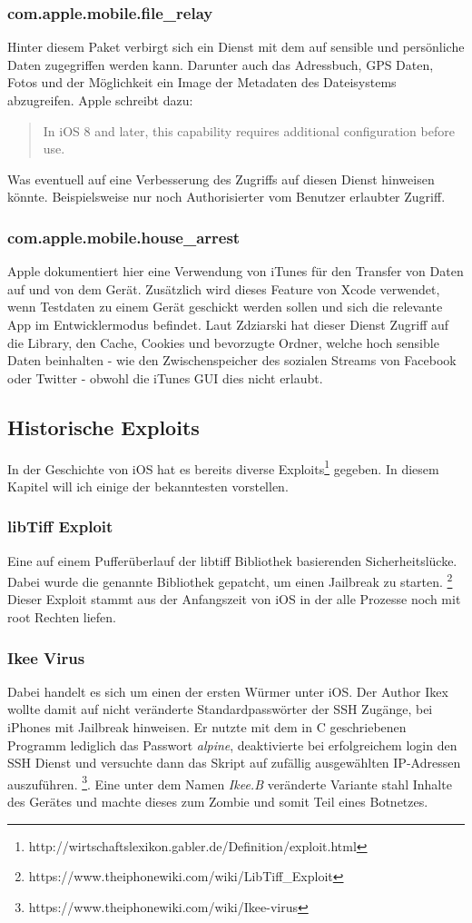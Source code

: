 		\subsubsection{com.apple.mobile.file\_relay}
			Hinter diesem Paket verbirgt sich ein Dienst mit dem auf sensible und
			persönliche Daten zugegriffen werden kann. Darunter auch das Adressbuch, GPS
			Daten, Fotos und der Möglichkeit ein Image der Metadaten des Dateisystems
			abzugreifen. Apple schreibt dazu:
			\begin{quote}
				In iOS 8 and later, this capability requires additional configuration before
				use.
			\end{quote}
			Was eventuell auf eine Verbesserung des Zugriffs auf diesen Dienst hinweisen
			könnte. Beispielsweise nur noch Authorisierter vom Benutzer erlaubter
			Zugriff.
		\subsubsection{com.apple.mobile.house\_arrest}
			Apple dokumentiert hier eine Verwendung von iTunes für den Transfer von Daten
			auf und von dem Gerät. Zusätzlich wird dieses Feature von Xcode verwendet,
			wenn Testdaten zu einem Gerät geschickt werden sollen und sich die relevante
			App im Entwicklermodus befindet. Laut Zdziarski hat dieser Dienst Zugriff auf
			die Library, den Cache, Cookies und bevorzugte Ordner, welche hoch sensible
			Daten beinhalten - wie den Zwischenspeicher des sozialen Streams von Facebook
			oder Twitter - obwohl die iTunes GUI dies nicht erlaubt.
	\subsection{Historische Exploits}
		In der Geschichte von iOS hat es bereits diverse
		Exploits\footnote{http://wirtschaftslexikon.gabler.de/Definition/exploit.html}
		gegeben. In diesem Kapitel will ich einige der bekanntesten vorstellen.
		\subsubsection{libTiff Exploit} 
			Eine auf einem Pufferüberlauf der libtiff Bibliothek basierenden
			Sicherheitslücke. Dabei wurde die genannte Bibliothek gepatcht, um einen
			Jailbreak zu starten.
			\footnote{https://www.theiphonewiki.com/wiki/LibTiff\_Exploit} Dieser Exploit
			stammt aus der Anfangszeit von iOS in der alle Prozesse noch mit root
			Rechten liefen.
		\subsubsection{Ikee Virus}
			Dabei handelt es sich um einen der ersten Würmer unter iOS. Der	Author Ikex
			wollte damit auf nicht veränderte Standardpasswörter der SSH Zugänge, bei
			iPhones mit Jailbreak hinweisen. Er nutzte mit dem in C geschriebenen
			Programm lediglich das Passwort \textsl{alpine}, deaktivierte bei
			erfolgreichem login den SSH Dienst und versuchte dann das Skript auf
			zufällig ausgewählten IP-Adressen auszuführen.
			\footnote{https://www.theiphonewiki.com/wiki/Ikee-virus}. Eine unter dem
			Namen \textsl{Ikee.B} veränderte Variante stahl Inhalte des Gerätes und
			machte dieses zum Zombie und somit Teil eines Botnetzes.
